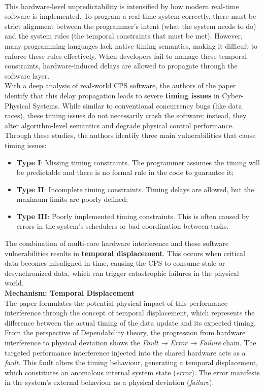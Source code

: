 \\
This hardware-level unpredictability is intensified by how modern real-time software is implemented. To program a real-time system correctly, there must be strict alignment between the programmer's intent (what the system needs to do) and the system rules (the temporal constraints that must be met). However, many programming languages lack native timing semantics, making it difficult to enforce these rules effectively. When developers fail to manage these temporal constraints, hardware-induced delays are allowed to propagate through the software layer.
\\
With a deep analysis of real-world CPS software, the authors of the paper identify that this delay propagation leads to severe \textbf{timing issues} in Cyber-Physical Systems. While similar to conventional concurrency bugs (like data races), these timing issues do not necessarily crash the software; instead, they alter algorithm-level semantics and degrade physical control performance. Through these studies, the authors identify three main vulnerabilities that cause timing issues:
\begin{itemize}[nosep]
    \item \textbf{Type I}: Missing timing constraints. The programmer assumes the timing will be predictable and there is no formal rule in the code to guarantee it;
    \item \textbf{Type II}: Incomplete timing constraints. Timing delays are allowed, but the maximum limits are poorly defined;
    \item \textbf{Type III}: Poorly implemented timing constraints. This is often caused by errors in the system's schedulers or bad coordination between tasks.
\end{itemize}
The combination of multi-core hardware interference and these software vulnerabilities results in \textbf{temporal displacement}. This occurs when critical data becomes misaligned in time, causing the CPS to consume stale or desynchronized data, which can trigger catastrophic failures in the physical world.
\\
\textbf{Mechanism: Temporal Displacement}\\
The paper formulates the potential physical impact of this performance interference through the concept of temporal displacement, which represents the difference between the actual timing of the data update and its expected timing. 
From the perspective of Dependability theory, the progression from hardware interference to physical deviation shows the \textit{Fault → Error → Failure} chain. The targeted performance interference injected into the shared hardware acts as a \textit{fault}. This fault alters the timing behaviour, generating a temporal displacement, which constitutes an anomalous internal system state (\textit{error}). The error manifests in the system's external behaviour as a physical deviation (\textit{failure}).
